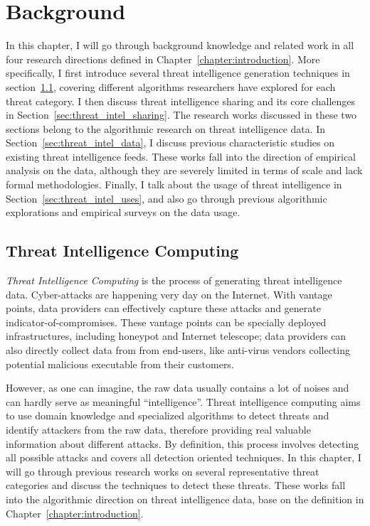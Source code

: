 \chapter{Background}
\label{chapter:background}

In this chapter, I will go through background knowledge and related work
in all four research directions defined in Chapter~\ref{chapter:introduction}.
More specifically, I first introduce several threat intelligence 
generation techniques in section~\ref{sec:threat_intel_generation}, covering 
different algorithms researchers have explored for each threat category. I
then discuss threat intelligence sharing and its core challenges in Section~\ref{sec:threat_intel_sharing}. The research works discussed in these
two sections belong to the algorithmic research on threat intelligence data. In 
Section~\ref{sec:threat_intel_data}, I discuss previous characteristic studies
on existing threat intelligence feeds. These works fall into the direction of empirical analysis on the data, although they are severely limited in terms of 
scale and lack formal methodologies. Finally, I talk about the usage
of threat intelligence in Section~\ref{sec:threat_intel_uses}, and also
go through previous algorithmic explorations and empirical surveys on the data
usage.

\section{Threat Intelligence Computing}
\label{sec:threat_intel_generation}

\textit{Threat Intelligence Computing} is the process of generating threat 
intelligence data. Cyber-attacks are happening very day on the Internet.
With vantage points, data providers can effectively capture these attacks 
and generate indicator-of-compromises. These vantage points can be specially
deployed infrastructures, including honeypot and Internet telescope; data
providers can also directly collect data from from end-users, like 
anti-virus vendors collecting potential malicious executable from their
customers. 

However, as one can imagine, the raw data usually contains a lot of noises 
and can hardly serve as meaningful ``intelligence''. Threat intelligence 
computing aims to use domain 
knowledge and specialized algorithms to detect threats and identify
attackers from the raw data, therefore providing real valuable 
information about different attacks. By definition, this process involves
detecting all possible attacks and covers all detection oriented 
techniques. In this chapter, I will go through previous research works
on several representative threat categories and discuss the techniques to 
detect these threats. These works fall into the algorithmic direction on
threat intelligence data, base on the definition in 
Chapter~\ref{chapter:introduction}.

